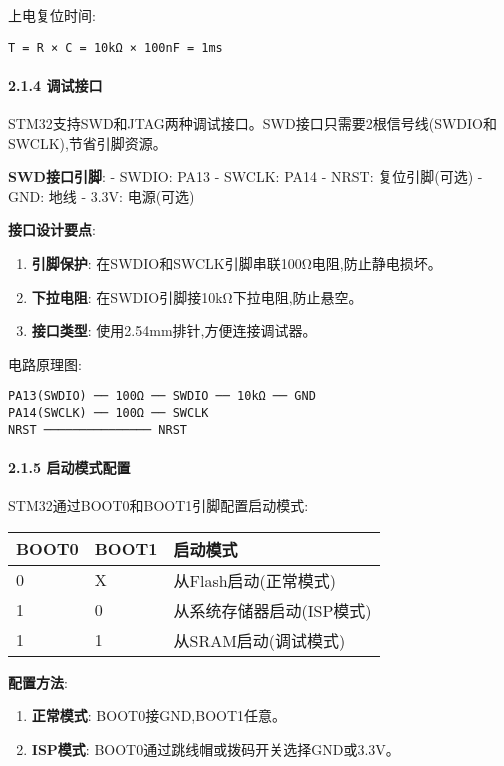 \documentclass[
]{article}
\begin{document}
上电复位时间:

\begin{verbatim}
T = R × C = 10kΩ × 100nF = 1ms
\end{verbatim}

\hypertarget{ux8c03ux8bd5ux63a5ux53e3}{%
\paragraph{2.1.4 调试接口}\label{ux8c03ux8bd5ux63a5ux53e3}}

STM32支持SWD和JTAG两种调试接口。SWD接口只需要2根信号线(SWDIO和SWCLK),节省引脚资源。

\textbf{SWD接口引脚}: - SWDIO: PA13 - SWCLK: PA14 - NRST: 复位引脚(可选)
- GND: 地线 - 3.3V: 电源(可选)

\textbf{接口设计要点}:

\begin{enumerate}
\def\labelenumi{\arabic{enumi}.}
\item
  \textbf{引脚保护}: 在SWDIO和SWCLK引脚串联100Ω电阻,防止静电损坏。
\item
  \textbf{下拉电阻}: 在SWDIO引脚接10kΩ下拉电阻,防止悬空。
\item
  \textbf{接口类型}: 使用2.54mm排针,方便连接调试器。
\end{enumerate}

电路原理图:

\begin{verbatim}
PA13(SWDIO) ── 100Ω ── SWDIO ── 10kΩ ── GND
PA14(SWCLK) ── 100Ω ── SWCLK
NRST ─────────────── NRST
\end{verbatim}

\hypertarget{ux542fux52a8ux6a21ux5f0fux914dux7f6e}{%
\paragraph{2.1.5
启动模式配置}\label{ux542fux52a8ux6a21ux5f0fux914dux7f6e}}

STM32通过BOOT0和BOOT1引脚配置启动模式:

\begin{longtable}[]{@{}lll@{}}
\toprule
BOOT0 & BOOT1 & 启动模式\tabularnewline
\midrule
\endhead
0 & X & 从Flash启动(正常模式)\tabularnewline
1 & 0 & 从系统存储器启动(ISP模式)\tabularnewline
1 & 1 & 从SRAM启动(调试模式)\tabularnewline
\bottomrule
\end{longtable}

\textbf{配置方法}:

\begin{enumerate}
\def\labelenumi{\arabic{enumi}.}
\item
  \textbf{正常模式}: BOOT0接GND,BOOT1任意。
\item
  \textbf{ISP模式}: BOOT0通过跳线帽或拨码开关选择GND或3.3V。
\end{enumerate}
\end{document}
